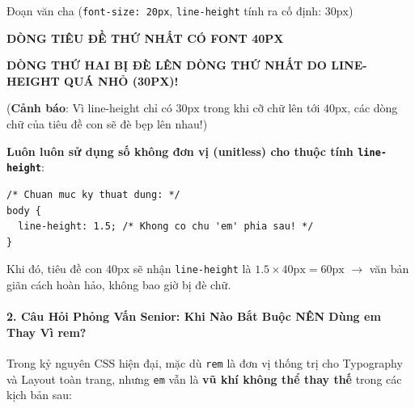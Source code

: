 \documentclass[11pt,oneside]{book}
\newcommand{\codeinline}[1]{\textcolor{accentOrange}{\texttt{#1}}}
\begin{document}
\begin{browserWindow}
\sffamily\small
\begin{tcolorbox}[enhanced, colback=white, colframe=red!35, arc=6pt, boxrule=0.8pt, top=10pt, bottom=10pt, left=12pt, right=12pt]
  {\fontsize{13pt}{16pt}\selectfont \textcolor{darkText}{Đoạn văn cha (\codeinline{font-size: 20px}, \codeinline{line-height} tính ra cố định: $30\text{px}$)}\par}
  \vspace{6pt}
  \begin{tcolorbox}[enhanced, colback=red!10, colframe=red!40, arc=4pt, boxrule=0.8pt, top=4pt, bottom=4pt, left=8pt, right=8pt]
    {\fontsize{24pt}{18pt}\selectfont \textcolor{red!80!black}{\textbf{DÒNG TIÊU ĐỀ THỨ NHẤT CÓ FONT 40PX}}\par}
    {\fontsize{24pt}{18pt}\selectfont \textcolor{red!80!black}{\textbf{DÒNG THỨ HAI BỊ ĐÈ LÊN DÒNG THỨ NHẤT DO LINE-HEIGHT QUÁ NHỎ (30PX)!}}\par}
  \end{tcolorbox}
  \vspace{3pt}
  \textcolor{red!80!black}{\scriptsize (\textbf{Cảnh báo}: Vì line-height chỉ có $30\text{px}$ trong khi cỡ chữ lên tới $40\text{px}$, các dòng chữ của tiêu đề con sẽ đè bẹp lên nhau!)}
\end{tcolorbox}
\end{browserWindow}

\begin{tipBox}
\textbf{Luôn luôn sử dụng số không đơn vị (unitless) cho thuộc tính \codeinline{line-height}}:
\begin{lstlisting}[language=CSS3]
/* Chuan muc ky thuat dung: */
body {
  line-height: 1.5; /* Khong co chu 'em' phia sau! */
}
\end{lstlisting}
Khi đó, tiêu đề con $40\text{px}$ sẽ nhận \codeinline{line-height} là $1.5 \times 40\text{px} = 60\text{px}$ $\rightarrow$ văn bản giãn cách hoàn hảo, không bao giờ bị đè chữ.
\end{tipBox}

\paragraph{2. Câu Hỏi Phỏng Vấn Senior: Khi Nào Bắt Buộc NÊN Dùng em Thay Vì rem?}
Trong kỷ nguyên CSS hiện đại, mặc dù \codeinline{rem} là đơn vị thống trị cho Typography và Layout toàn trang, nhưng \codeinline{em} vẫn là \textbf{vũ khí không thể thay thế} trong các kịch bản sau:
\end{document}
